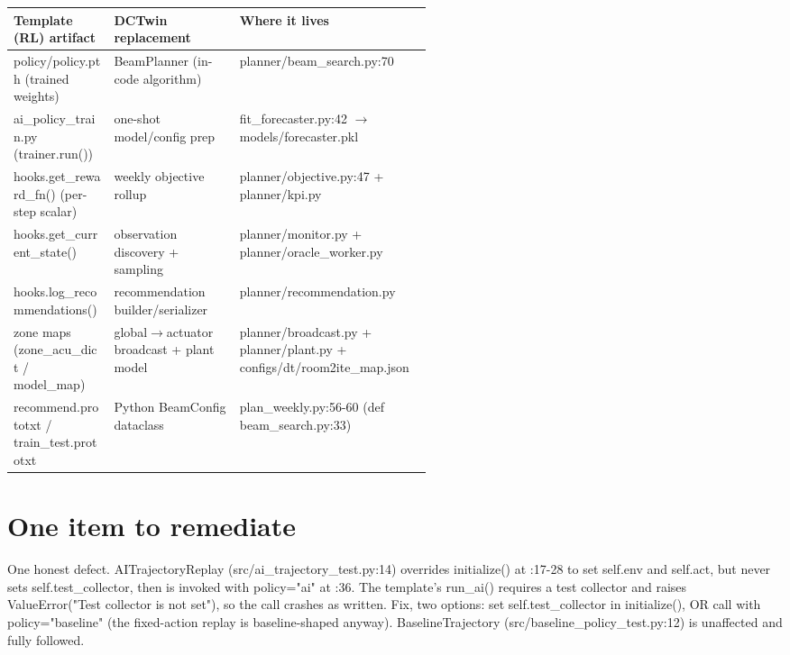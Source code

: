 \documentclass[10pt]{article}
\begin{document}
\vspace{1pt}\begin{tabularx}{\linewidth}{@{}p{0.24\linewidth} p{0.30\linewidth} X@{}}
\toprule
\textbf{Template (RL) artifact} & \textbf{DCTwin replacement} & \textbf{Where it lives} \\
\midrule
policy/\allowbreak{}policy.pth (trained weights) & BeamPlanner (in-code algorithm) & planner/\allowbreak{}beam\_\allowbreak{}search.py:70 \\
ai\_\allowbreak{}policy\_\allowbreak{}train.py (trainer.run()) & one-shot model/\allowbreak{}config prep & fit\_\allowbreak{}forecaster.py:42 $\rightarrow$ models/\allowbreak{}forecaster.pkl \\
hooks.get\_\allowbreak{}reward\_\allowbreak{}fn() (per-step scalar) & weekly objective rollup & planner/\allowbreak{}objective.py:47 + planner/\allowbreak{}kpi.py \\
hooks.get\_\allowbreak{}current\_\allowbreak{}state() & observation discovery + sampling & planner/\allowbreak{}monitor.py + planner/\allowbreak{}oracle\_\allowbreak{}worker.py \\
hooks.log\_\allowbreak{}recommendations() & recommendation builder/\allowbreak{}serializer & planner/\allowbreak{}recommendation.py \\
zone maps (zone\_\allowbreak{}acu\_\allowbreak{}dict /\allowbreak{} model\_\allowbreak{}map) & global$\rightarrow$actuator broadcast + plant model & planner/\allowbreak{}broadcast.py + planner/\allowbreak{}plant.py + configs/\allowbreak{}dt/\allowbreak{}room2ite\_\allowbreak{}map.json \\
recommend.prototxt /\allowbreak{} train\_\allowbreak{}test.prototxt & Python BeamConfig dataclass & plan\_\allowbreak{}weekly.py:56-60 (def beam\_\allowbreak{}search.py:33) \\
\bottomrule
\end{tabularx}\vspace{2pt}

\section*{One item to remediate}
One honest defect. AITrajectoryReplay (src/\allowbreak{}ai\_\allowbreak{}trajectory\_\allowbreak{}test.py:14) overrides initialize() at :17-28 to set self.env and self.act, but never sets self.test\_\allowbreak{}collector, then is invoked with policy="ai" at :36. The template's run\_\allowbreak{}ai() requires a test collector and raises ValueError("Test collector is not set"), so the call crashes as written. Fix, two options: set self.test\_\allowbreak{}collector in initialize(), OR call with policy="baseline" (the fixed-action replay is baseline-shaped anyway). BaselineTrajectory (src/\allowbreak{}baseline\_\allowbreak{}policy\_\allowbreak{}test.py:12) is unaffected and fully followed.
\end{document}
